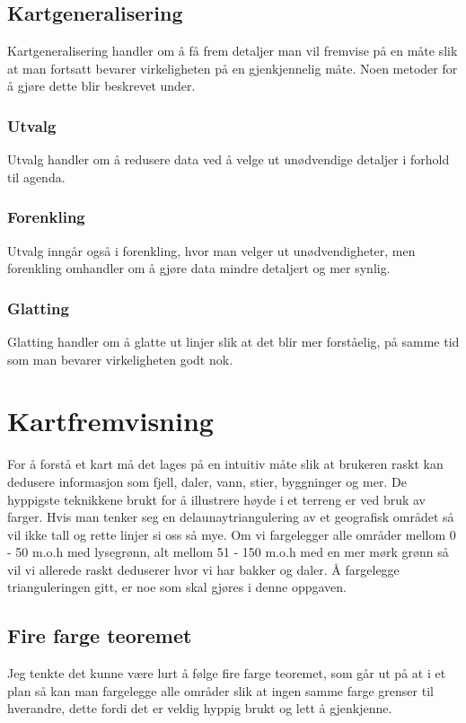 \documentclass[norsk]{article}
\begin{document}
\subsection{Kartgeneralisering}
Kartgeneralisering handler om å få frem detaljer man vil fremvise på en
måte slik at man fortsatt bevarer virkeligheten på en gjenkjennelig måte.
Noen metoder for å gjøre dette blir beskrevet under.

\subsubsection{Utvalg}
Utvalg handler om å redusere data ved å velge ut unødvendige detaljer i forhold
til agenda.

\subsubsection{Forenkling}
Utvalg inngår også i forenkling, hvor man velger ut unødvendigheter, men 
forenkling omhandler om å gjøre data mindre detaljert og mer synlig.

\subsubsection{Glatting}
Glatting handler om å glatte ut linjer slik at det blir mer forståelig, på samme
tid som man bevarer virkeligheten godt nok.

\section{Kartfremvisning}
For å forstå et kart må det lages på en intuitiv måte slik at brukeren
raskt kan dedusere informasjon som fjell, daler, vann, stier, byggninger og mer.
De hyppigste teknikkene brukt for å illustrere høyde i et terreng er ved bruk
av farger. Hvis man tenker seg en delaunaytriangulering av et geografisk
området så vil ikke tall og rette linjer si oss så mye. Om vi fargelegger 
alle områder mellom 0 - 50 m.o.h med lysegrønn, alt mellom 51 - 150
m.o.h med en mer mørk grønn så vil vi allerede raskt deduserer hvor vi har
bakker og daler. Å fargelegge trianguleringen gitt, er noe som skal gjøres i 
denne oppgaven.

\subsection{Fire farge teoremet}
Jeg tenkte det kunne være lurt å følge fire farge teoremet, som går ut på at i et plan så kan man fargelegge alle områder slik at ingen samme farge grenser til hverandre, dette fordi det er veldig hyppig brukt og lett å gjenkjenne.
\end{document}
